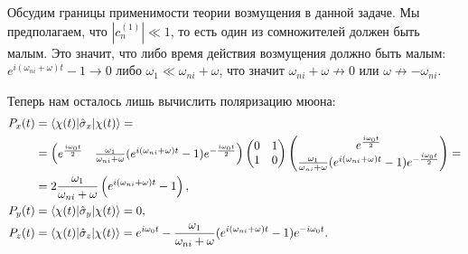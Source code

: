 Обсудим границы применимости теории возмущения в данной задаче. Мы
предполагаем, что $\left|c_n^{(1)}\right|\ll 1$, то есть один из сомножителей
должен быть малым. Это значит, что либо время действия возмущения должно быть
малым: $e^{i(\omega_{ni}+\omega)t}-1\to0$ либо $\omega_1\ll\omega_{ni}+\omega$,
что значит $\omega_{ni}+\omega\not\to0$ или $\omega\not\to-\omega_{ni}$.

Теперь нам осталось лишь вычислить поляризацию мюона:
\begin{align*}
  P_x(t) &= \langle\chi(t)\rvert\hat{\sigma}_x\lvert\chi(t)\rangle = \\ &= \begin{pmatrix}
    e^{\frac{i\omega_0 t}{2}} & \frac{\omega_1}{\omega_{ni}+\omega}(e^{i(\omega_{ni}+\omega)t}-1)e^{-\frac{i\omega_0 t}{2}}
  \end{pmatrix}\begin{pmatrix}
    0&1\\1&0
  \end{pmatrix}\begin{pmatrix}
    e^{\frac{i\omega_0 t}{2}} \\ \frac{\omega_1}{\omega_{ni}+\omega}(e^{i(\omega_{ni}+\omega)t}-1)e^{-\frac{i\omega_0 t}{2}}
  \end{pmatrix} = \\&=2\frac{\omega_1}{\omega_{ni}+\omega}\left(e^{i(\omega_{ni}+\omega)t}-1\right), \\
  P_y(t) &= \langle\chi(t)\rvert\hat{\sigma}_y\lvert\chi(t)\rangle = 0, \\
  P_z(t) &= \langle\chi(t)\rvert\hat{\sigma}_z\lvert\chi(t)\rangle = e^{i\omega_0 t}-\frac{\omega_1}{\omega_{ni}+\omega}(e^{i(\omega_{ni}+\omega)t}-1)e^{-i\omega_0 t}.
\end{align*}
\qedsq
